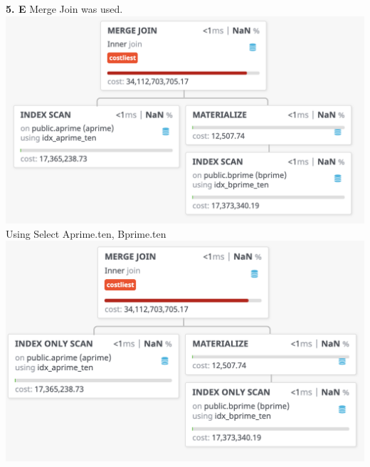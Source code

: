 \documentclass[12pt, letterpaper, fleqn]{article}
\begin{document}
  \textbf{5. E}
  Merge Join was used. \\
  \includegraphics[scale=0.5]{query_pics/5.png} \\
  Using Select Aprime.ten, Bprime.ten\\
  \includegraphics[scale=0.5]{query_pics/5b.png} \\\\
  
\end{document}
